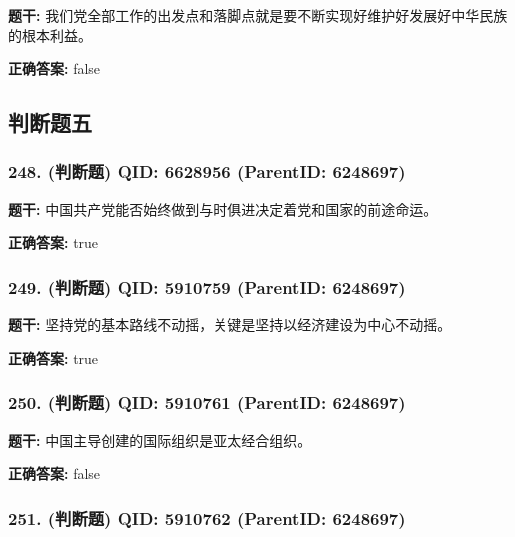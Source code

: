 \documentclass[12pt,UTF8]{ctexart}
\begin{document}
\textbf{题干:}
我们党全部工作的出发点和落脚点就是要不断实现好维护好发展好中华民族的根本利益。



\textbf{正确答案:}
false

\vspace{0.3em}\hrulefill\vspace{0.7em}

\subsection*{判断题五}

\subsubsection*{248. (判断题) \small QID: 6628956 (ParentID: 6248697)}

\textbf{题干:}
中国共产党能否始终做到与时俱进决定着党和国家的前途命运。



\textbf{正确答案:}
true

\vspace{0.3em}\hrulefill\vspace{0.7em}

\subsubsection*{249. (判断题) \small QID: 5910759 (ParentID: 6248697)}

\textbf{题干:}
坚持党的基本路线不动摇，关键是坚持以经济建设为中心不动摇。



\textbf{正确答案:}
true

\vspace{0.3em}\hrulefill\vspace{0.7em}

\subsubsection*{250. (判断题) \small QID: 5910761 (ParentID: 6248697)}

\textbf{题干:}
中国主导创建的国际组织是亚太经合组织。



\textbf{正确答案:}
false

\vspace{0.3em}\hrulefill\vspace{0.7em}

\subsubsection*{251. (判断题) \small QID: 5910762 (ParentID: 6248697)}
\end{document}
